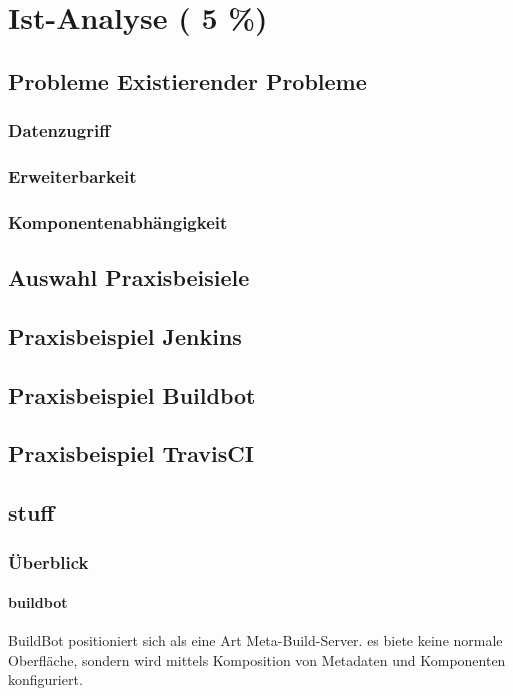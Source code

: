 \chapter{Ist-Analyse ( 5 \%)}
\label{chap:ist-analyse}
\section{Probleme Existierender Probleme}
\subsection{Datenzugriff}
\subsection{Erweiterbarkeit}
\subsection{Komponentenabh\"angigkeit}
\section{Auswahl Praxisbeisiele}
\section{Praxisbeispiel Jenkins}
\section{Praxisbeispiel Buildbot}
\section{Praxisbeispiel TravisCI}

\section{stuff}
\subsection{Überblick}

\subsubsection{buildbot}

BuildBot positioniert sich als eine Art Meta-Build-Server.
es biete keine normale Oberfläche, sondern wird mittels
Komposition von Metadaten und Komponenten konfiguriert.

